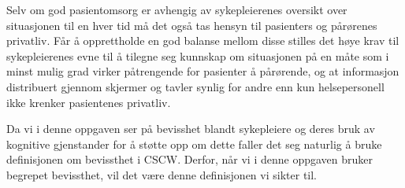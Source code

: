 \noindent
Selv om god pasientomsorg er avhengig av sykepleierenes oversikt over situasjonen til en hver tid må det også tas hensyn til pasienters og pårørenes privatliv. Får å opprettholde en god balanse mellom disse stilles det høye krav til sykepleierenes evne til å tilegne seg kunnskap om situasjonen på en måte som i minst mulig grad virker påtrengende for pasienter å pårørende, og at informasjon distribuert gjennom skjermer og tavler synlig for andre enn kun helsepersonell ikke krenker pasientenes privatliv\cite{Ebright10}.

\noindent
Da vi i denne oppgaven ser på bevisshet blandt sykepleiere og deres bruk av kognitive gjenstander for å støtte opp om dette faller det seg naturlig å bruke definisjonen om bevissthet i CSCW. Derfor, når vi i denne oppgaven bruker begrepet bevissthet, vil det være denne definisjonen vi sikter til.

